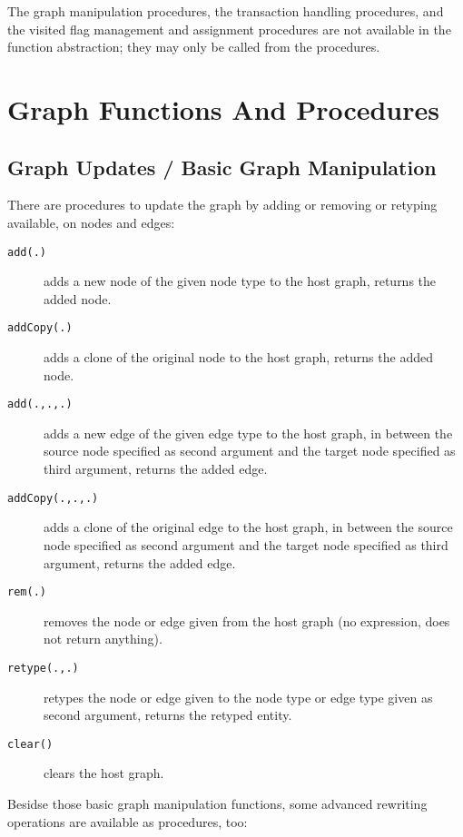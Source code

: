 The graph manipulation procedures, the transaction handling procedures, and the visited flag management and assignment procedures are not available in the function abstraction; they may only be called from the procedures.

\section{Graph Functions And Procedures}\label{neighbouringelementsfunctions}

\subsection{Graph Updates / Basic Graph Manipulation}

There are procedures to update the graph by adding or removing or retyping available, on nodes and edges: 

\begin{description}
\item[\texttt{add(.)}] adds a new node of the given node type to the host graph, returns the added node.
\item[\texttt{addCopy(.)}] adds a clone of the original node to the host graph, returns the added node.
\item[\texttt{add(.,.,.)}] adds a new edge of the given edge type to the host graph, in between the source node specified as second argument and the target node specified as third argument, returns the added edge.
\item[\texttt{addCopy(.,.,.)}] adds a clone of the original edge to the host graph, in between the source node specified as second argument and the target node specified as third argument, returns the added edge.
\item[\texttt{rem(.)}] removes the node or edge given from the host graph (no expression, does not return anything).
\item[\texttt{retype(.,.)}] retypes the node or edge given to the node type or edge type given as second argument, returns the retyped entity.
\item[\texttt{clear()}] clears the host graph.
\end{description}

\noindent Besidse those basic graph manipulation functions, some advanced rewriting operations are available as procedures, too:

